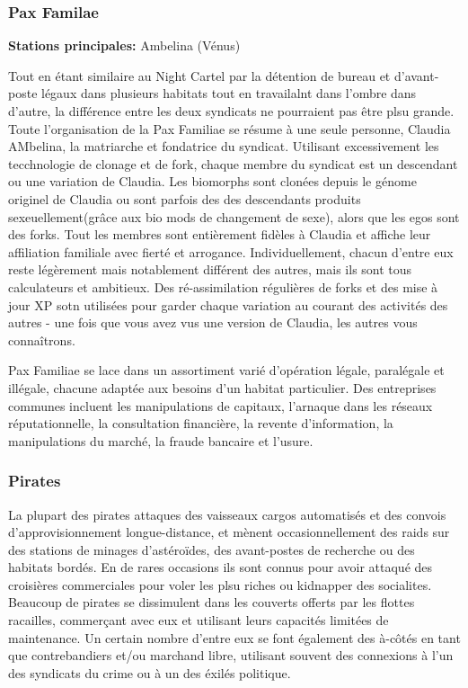 \subsubsection{Pax Familae} \label{sec:pax-familae} 

\textbf{Stations principales:} Ambelina (Vénus) 

Tout en étant similaire au Night Cartel par la détention de bureau et d'avant-poste légaux dans plusieurs habitats tout en travailalnt dans l'ombre dans d'autre, la différence entre les deux syndicats ne pourraient pas être plsu grande. Toute l'organisation de la Pax Familiae se résume à une seule personne, Claudia AMbelina, la matriarche et fondatrice du syndicat. Utilisant excessivement les tecchnologie de  clonage et de fork, chaque membre du syndicat est un descendant ou une variation de Claudia. Les biomorphs sont clonées depuis le génome originel de Claudia ou sont parfois des des descendants produits sexeuellement(grâce aux bio mods de changement de sexe), alors que les egos sont des forks. Tout les membres sont entièrement fidèles à Claudia et affiche leur affiliation familiale avec fierté et arrogance. Individuellement, chacun d'entre eux reste légèrement mais notablement différent des autres, mais ils sont tous calculateurs et ambitieux. Des ré-assimilation régulières de forks et des mise à jour XP sotn utilisées pour garder chaque variation au courant des activités des autres - une fois que vous avez vus une version de Claudia, les autres vous connaîtrons. 

Pax Familiae se lace dans un assortiment varié d'opération légale, paralégale et illégale, chacune adaptée aux besoins d'un habitat particulier. Des entreprises communes incluent les manipulations de capitaux, l'arnaque dans les réseaux réputationnelle, la consultation financière, la revente d'information, la manipulations du marché, la fraude bancaire et l'usure. 

\subsubsection{Pirates} \label{sec:pirates} 

La plupart des pirates attaques des vaisseaux cargos automatisés et des convois d'approvisionnement longue-distance, et mènent occasionnellement des raids sur des stations de minages d'astéroïdes, des avant-postes de recherche ou des habitats bordés. En de rares occasions ils sont connus pour avoir attaqué des croisières commerciales pour voler les plsu riches ou kidnapper des socialites. Beaucoup de pirates se dissimulent dans les couverts offerts par les flottes racailles, commerçant avec eux et utilisant leurs capacités limitées de maintenance. Un certain nombre d'entre eux se font également des à-côtés en tant que contrebandiers et/ou marchand libre, utilisant souvent des connexions à l'un des syndicats du crime ou à un des éxilés politique. 


